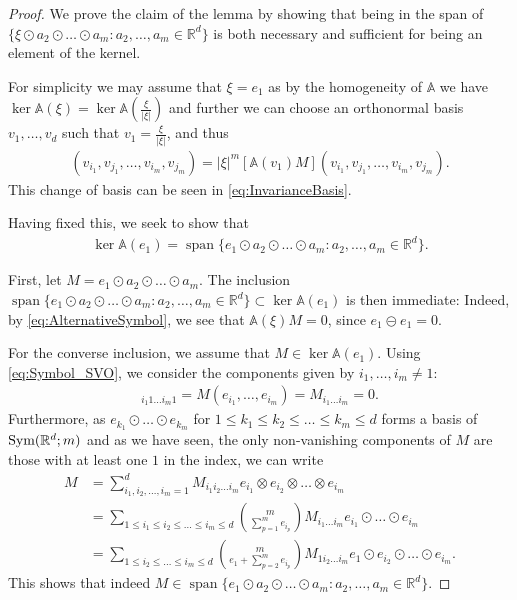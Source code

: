 \documentclass[a4paper, 10pt, twoside, notitlepage]{amsart}
\theoremstyle{plain}
\newcommand{\R}{\mathbb{R}}
\renewcommand{\AA}{\mathbb{A}}
\renewcommand{\S}[1]{\textup{Sym}(\R^d;#1)}
\DeclareMathOperator{\vspan}{span}
\begin{document}
	\begin{proof}
		We prove the claim of the lemma by showing that being in the span of $\{\xi \odot a_2 \odot \dots \odot a_m: a_2,\dots,a_m \in \R^d \}$ is both necessary and sufficient for being an element
		of the kernel.
		
		For simplicity we may assume that $\xi = e_1$ as by the homogeneity of $\AA$ we have $\ker \AA(\xi) = \ker \AA(\frac{\xi}{|\xi|})$ and further we can choose an orthonormal basis
		$v_1,\dots,v_d$ such that $v_1 = \frac{\xi}{|\xi|}$, and thus
		\begin{align*} [\AA(\xi)M](v_{i_1},v_{j_1},\dots,v_{i_m},v_{j_m}) = |\xi|^m[\AA(v_1)M](v_{i_1},v_{j_1},\dots,v_{i_m},v_{j_m}).
		\end{align*}
		This change of basis can be seen in \cref{eq:InvarianceBasis}.
		
		Having fixed this, we seek to show that
		\begin{align*}
			\ker \AA(e_1) = \vspan\Big\{ e_1 \odot a_2 \odot \dots \odot a_m: a_2,\dots,a_m \in \R^d\Big\}.
		\end{align*}
		
		First, let $M = e_1 \odot a_2 \odot \dots \odot a_m$. The inclusion $\vspan\Big\{ e_1 \odot a_2 \odot \dots \odot a_m: a_2,\dots,a_m \in \R^d\Big\} \subset \ker \AA(e_1) $ is
		then immediate: Indeed, by \cref{eq:AlternativeSymbol}, we see that $\AA(\xi)M = 0$, since $e_1 \circleddash e_1 = 0$. 
		
		For the converse inclusion, we assume that $M \in \ker \AA(e_1)$. Using \cref{eq:Symbol_SVO}, we consider the components given by $i_1,\dots,i_m \neq 1$:
			\begin{align*} [\AA(e_1)M]_{i_1 1 \dots i_m 1} = M(e_{i_1}, \dots, e_{i_m}) = M_{i_1 \dots i_m} = 0.
			\end{align*}
			Furthermore, as $e_{k_1} \odot \dots \odot e_{k_m}$ for $1 \leq k_1 \leq k_2 \leq \dots \leq k_m \leq d$ forms a basis of $\S{m}$ and as we have seen, the only non-vanishing components of $M$ are those with at least one $1$ in the index, we can write 
			\begin{align*}
				M & = \sum_{i_1,i_2,\dots,i_m = 1}^d M_{i_1 i_2 \dots i_m} e_{i_1} \otimes e_{i_2} \otimes \dots \otimes e_{i_m} \\
				& = \sum_{1 \leq i_1 \leq i_2 \leq \dots \leq i_m \leq d} \binom{m}{\sum_{p=1}^m e_{i_p}} M_{i_1 \dots i_m} e_{i_1} \odot \dots \odot e_{i_m}\\
				& = \sum_{1 \leq i_2 \leq \dots \leq i_m \leq d} \binom{m}{e_1 + \sum_{p=2}^m e_{i_p}} M_{1 i_2 \dots i_m} e_1 \odot e_{i_2} \odot \dots \odot e_{i_m}.
			\end{align*}
			This shows that indeed $M \in \vspan\{e_1 \odot a_2 \odot \dots \odot a_m: a_2,\dots,a_m \in \R^d\}$.
		\end{proof}
		
\end{document}

